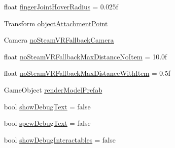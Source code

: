 \begin{DoxyCompactItemize}
\item 
float \mbox{\hyperlink{class_valve_1_1_v_r_1_1_interaction_system_1_1_hand_ade86e307d47453ecbfd89365696d1c86}{finger\+Joint\+Hover\+Radius}} = 0.\+025f
\item 
Transform \mbox{\hyperlink{class_valve_1_1_v_r_1_1_interaction_system_1_1_hand_a989d3b99573fcde9a1f451c6f56f4d0e}{object\+Attachment\+Point}}
\item 
Camera \mbox{\hyperlink{class_valve_1_1_v_r_1_1_interaction_system_1_1_hand_a287ff904313aa07224a718959bdee4c5}{no\+Steam\+V\+R\+Fallback\+Camera}}
\item 
float \mbox{\hyperlink{class_valve_1_1_v_r_1_1_interaction_system_1_1_hand_a649aab3a437b29d665e0e28f6c50dbf3}{no\+Steam\+V\+R\+Fallback\+Max\+Distance\+No\+Item}} = 10.\+0f
\item 
float \mbox{\hyperlink{class_valve_1_1_v_r_1_1_interaction_system_1_1_hand_a639ec79ef8bd910ffafeebdf58696fd4}{no\+Steam\+V\+R\+Fallback\+Max\+Distance\+With\+Item}} = 0.\+5f
\item 
Game\+Object \mbox{\hyperlink{class_valve_1_1_v_r_1_1_interaction_system_1_1_hand_a99fb5c5223ef62ddb5e9fe69a918820a}{render\+Model\+Prefab}}
\item 
bool \mbox{\hyperlink{class_valve_1_1_v_r_1_1_interaction_system_1_1_hand_a38a3c203d007f2b2ca33f34649b4edbf}{show\+Debug\+Text}} = false
\item 
bool \mbox{\hyperlink{class_valve_1_1_v_r_1_1_interaction_system_1_1_hand_aa37856102a819d1def81a0e1df82623f}{spew\+Debug\+Text}} = false
\item 
bool \mbox{\hyperlink{class_valve_1_1_v_r_1_1_interaction_system_1_1_hand_aad8d9bb0007b16f7934d7cd3229923ae}{show\+Debug\+Interactables}} = false
\end{DoxyCompactItemize}
